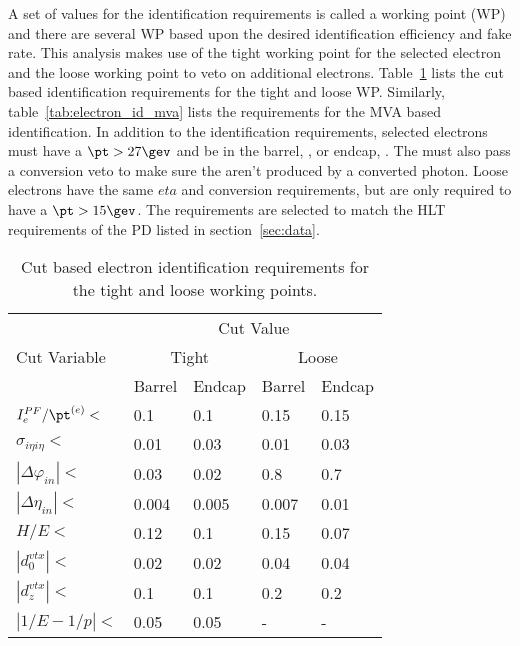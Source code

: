 A set of values for the identification requirements is called a working point (WP) and there are several WP based upon the desired identification efficiency and fake rate.
This analysis makes use of the tight working point for the selected electron and the loose working point to veto on additional electrons.
Table~\ref{tab:electron_id_cut} lists the cut based identification requirements for the tight and loose WP.
Similarly, table~\ref{tab:electron_id_mva} lists the requirements for the MVA based identification.
In addition to the identification requirements, selected electrons must have a $\pt>27\gev$ and be in the barrel, , or endcap, .
The must also pass a conversion veto to make sure the aren't produced by a converted photon.
Loose electrons have the same $eta$ and conversion requirements, but are only required to have a $\pt>15\gev$.
The \pt requirements are selected to match the HLT requirements of the PD listed in section~\ref{sec:data}.

\begin{table}[htbp]
    \caption{Cut based electron identification requirements for the tight and loose working points.}
    \centering
    \begin{tabular}{lllll}
        \hline
        \multirow{3}{*}{Cut Variable} & \multicolumn{4}{c}{Cut Value} \\\cline{2-5}
                                      & \multicolumn{2}{c}{Tight}     & \multicolumn{2}{c}{Loose} \\\cline{2-5}
                                      & Barrel & Endcap & Barrel & Endcap \\
        \hline
        $I_{e}^{PF}/\pt^{(e)}<$       & 0.1    & 0.1    & 0.15   & 0.15   \\
        $\sigma_{i{\eta}i{\eta}}<$    & 0.01   & 0.03   & 0.01   & 0.03   \\
        $|\Delta\varphi_{in}|<$       & 0.03   & 0.02   & 0.8    & 0.7    \\
        $|\Delta\eta_{in}|<$          & 0.004  & 0.005  & 0.007  & 0.01   \\
        $H/E<$                        & 0.12   & 0.1    & 0.15   & 0.07   \\
        $|d_{0}^{vtx}|<$              & 0.02   & 0.02   & 0.04   & 0.04   \\
        $|d_{z}^{vtx}|<$              & 0.1    & 0.1    & 0.2    & 0.2    \\
        $|1/E-1/p|<$                  & 0.05   & 0.05   & -      & -      \\
        \hline
    \end{tabular}
    \label{tab:electron_id_cut}
\end{table}

